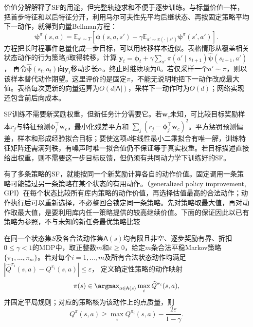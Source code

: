 价值分解解释了SF的用途，但完整轨迹求和不便于逐步训练。与标量价值一样，把首步特征和以后特征分开，利用马尔可夫性先平均后继状态、再按固定策略平均下一动作，就得到向量Bellman方程：
\begin{equation}
 \bm\psi^\pi(s,a)=
 \mathbb E_{s'\sim T}\left[\bm\phi(s,a,s')
 +\gamma\mathbb E_{a'\sim\pi(\cdot\mid s')}\bm\psi^\pi(s',a')\right].
 \label{eq:rl-transfer-sf-bellman}
\end{equation}
方程把长时程事件总量化成一步目标，可以用转移样本近似。表格情形从覆盖相关状态动作的行为策略$\beta$取得转移，计算
$\bm y_t=\bm\phi_t+\gamma\sum_{a'}\pi(a'\mid s_{t+1})\widehat{\bm\psi}(s_{t+1},a')$，
再令$\widehat{\bm\psi}(s_t,a_t)$向$\bm y_t$移动步长$\alpha$。终止时继续项为0。若仅采样一个$a'\sim\pi$，则以该样本替代动作期望。这里评价的是固定$\pi$，不能无说明地把下一动作改成最大值。表格每次更新的向量运算为$O(d|\mathsf A|)$，采样下一动作时为$O(d)$；网络实现还包含前后向成本。

SF训练不需要新奖励权重，但新任务计分需要它。若$\bm w_c$未知，可比较目标奖励样本$r_j$与特征预测$\bm\phi_j^\top\bm w_c$，最小化残差平方和
$\sum_j(r_j-\bm\phi_j^\top\bm w_c)^2$。平方惩罚预测偏差，样本和形成经验拟合目标；要使这项$d$维线性最小二乘拟合有唯一解，训练特征矩阵还需满列秩，有噪声时唯一拟合值仍不保证等于真实权重。若目标描述直接给出权重，则不需要这一步目标反馈，但仍须有共同动力学下训练好的SF。

有了多条策略的SF，就能按同一个新奖励计算各自的动作价值。固定调用一条策略可能错过另一条策略在某个状态的有用动作。（generalized policy improvement, GPI）在每个状态比较所有库内策略的动作价值，再选择估值最高的合法动作；动作执行后可以重新选择，不必整回合锁定同一条策略。先对策略取最大值，再对动作取最大值，是要利用库内任一策略提供的较高继续价值。下面的保证因此以已有策略为参照，不与未知的新任务最优策略比较

\begin{theorem}[有一致估计误差的广义策略改进]
 \label{thm:rl-transfer-gpi}
 在同一个状态集$S$及各合法动作集$\mathsf A(s)$均有限且非空、逐步奖励有界、折扣$0\leq\gamma<1$的MDP中，取正整数$m$和$\varepsilon\geq0$，给定$m$条合法平稳Markov策略
 $\{\pi_1,\ldots,\pi_m\}$。若对每个$i=1,\ldots,m$及所有合法状态动作均满足
 $|\widehat Q^{\pi_i}(s,a)-Q^{\pi_i}(s,a)|\leq\varepsilon$，
 定义确定性策略的动作映射
 \[
 \pi(s)\in\argmax_{a\in\mathsf A(s)}\max_i\widehat Q^{\pi_i}(s,a),
 \]
 并固定平局规则；对应的策略核为该动作上的点质量，则
 \begin{equation}
 Q^\pi(s,a)\geq\max_iQ^{\pi_i}(s,a)
                -\frac{2\varepsilon}{1-\gamma}.
 \label{eq:rl-transfer-gpi-bound}
 \end{equation}
\end{theorem}

